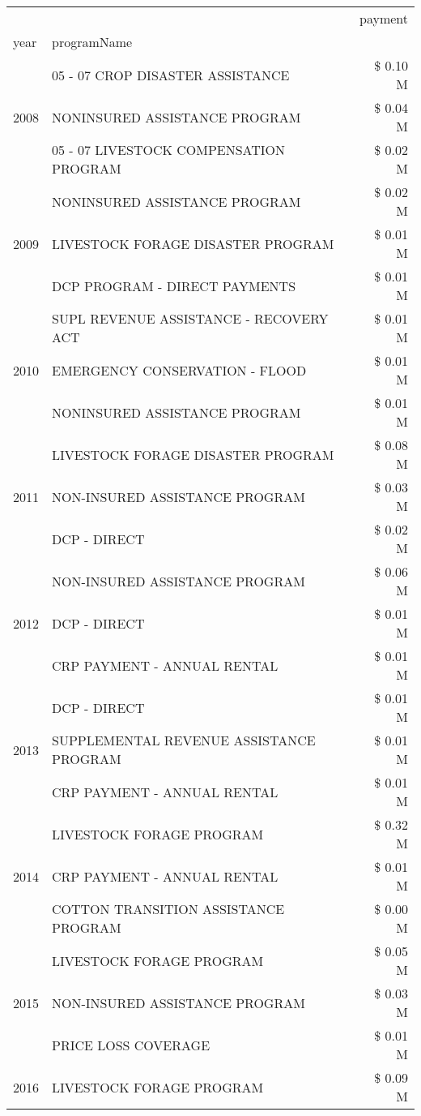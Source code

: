 \begin{tabular}{llr}
\toprule
 &  & payment \\
year & programName &  \\
\midrule
\multirow[t]{3}{*}{2008} & 05 - 07 CROP DISASTER ASSISTANCE & \$ 0.10 M \\
 & NONINSURED ASSISTANCE PROGRAM & \$ 0.04 M \\
 & 05 - 07 LIVESTOCK COMPENSATION PROGRAM & \$ 0.02 M \\
\cline{1-3}
\multirow[t]{3}{*}{2009} & NONINSURED ASSISTANCE PROGRAM & \$ 0.02 M \\
 & LIVESTOCK FORAGE DISASTER  PROGRAM & \$ 0.01 M \\
 & DCP PROGRAM - DIRECT PAYMENTS & \$ 0.01 M \\
\cline{1-3}
\multirow[t]{3}{*}{2010} & SUPL REVENUE ASSISTANCE - RECOVERY ACT & \$ 0.01 M \\
 & EMERGENCY CONSERVATION - FLOOD & \$ 0.01 M \\
 & NONINSURED ASSISTANCE PROGRAM & \$ 0.01 M \\
\cline{1-3}
\multirow[t]{3}{*}{2011} & LIVESTOCK FORAGE DISASTER PROGRAM & \$ 0.08 M \\
 & NON-INSURED ASSISTANCE PROGRAM & \$ 0.03 M \\
 & DCP - DIRECT & \$ 0.02 M \\
\cline{1-3}
\multirow[t]{3}{*}{2012} & NON-INSURED ASSISTANCE PROGRAM & \$ 0.06 M \\
 & DCP - DIRECT & \$ 0.01 M \\
 & CRP PAYMENT - ANNUAL RENTAL & \$ 0.01 M \\
\cline{1-3}
\multirow[t]{3}{*}{2013} & DCP - DIRECT & \$ 0.01 M \\
 & SUPPLEMENTAL REVENUE ASSISTANCE PROGRAM & \$ 0.01 M \\
 & CRP PAYMENT - ANNUAL RENTAL & \$ 0.01 M \\
\cline{1-3}
\multirow[t]{3}{*}{2014} & LIVESTOCK FORAGE PROGRAM & \$ 0.32 M \\
 & CRP PAYMENT - ANNUAL RENTAL & \$ 0.01 M \\
 & COTTON TRANSITION ASSISTANCE PROGRAM & \$ 0.00 M \\
\cline{1-3}
\multirow[t]{3}{*}{2015} & LIVESTOCK FORAGE PROGRAM & \$ 0.05 M \\
 & NON-INSURED ASSISTANCE PROGRAM & \$ 0.03 M \\
 & PRICE LOSS COVERAGE & \$ 0.01 M \\
\cline{1-3}
\multirow[t]{3}{*}{2016} & LIVESTOCK FORAGE PROGRAM & \$ 0.09 M \\

\end{tabular}

